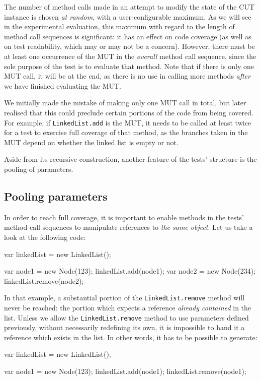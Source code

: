 The number of method calls made in an attempt to modify the state of the CUT instance is chosen \emph{at random}, with a user-configurable maximum. As we will see in the experimental evaluation, this maximum with regard to the length of method call sequences is significant: it has an effect on code coverage (as well as on test readability, which may or may not be a concern). However, there must be at least one occurrence of the MUT in the \emph{overall} method call sequence, since the sole purpose of the test is to evaluate that method. Note that if there is only one MUT call, it will be at the end, as there is no use in calling more methods \emph{after} we have finished evaluating the MUT.

We initially made the mistake of making only one MUT call in total, but later realised that this could preclude certain portions of the code from being covered. For example, if \texttt{LinkedList.add} is the MUT, it needs to be called at least twice for a test to exercise full coverage of that method, as the branches taken in the MUT depend on whether the linked list is empty or not.

Aside from its recursive construction, another feature of the tests' structure is the pooling of parameters.

\subsection{Pooling parameters}
In order to reach full coverage, it is important to enable methods in the tests' method call sequences to manipulate references to \emph{the same object}. Let us take a look at the following code:

\begin{code}[caption=Unreachable code,label=unreachable]
var linkedList = new LinkedList();

var node1 = new Node(123);
linkedList.add(node1);
var node2 = new Node(234);
linkedList.remove(node2);
\end{code}

In that example, a substantial portion of the \texttt{LinkedList.remove} method will never be reached: the portion which expects a reference \emph{already contained} in the list. Unless we allow the \texttt{LinkedList.remove} method to use parameters defined previously, without necessarily redefining its own, it is impossible to hand it a reference which exists in the list. In other words, it has to be possible to generate:

\begin{code}[caption=Pooling,label=pooling]
var linkedList = new LinkedList();

var node1 = new Node(123);
linkedList.add(node1);
linkedList.remove(node1);
\end{code}

